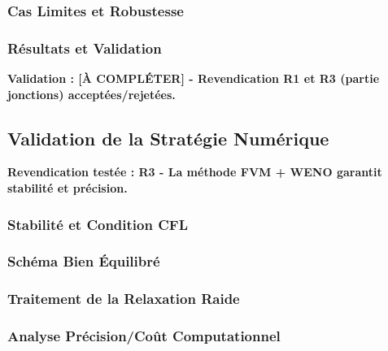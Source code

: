 \subsubsection{Cas Limites et Robustesse}
\label{subsec:cas_limites_jonctions}

\subsubsection{Résultats et Validation}
\label{subsec:resultats_jonctions}

\textbf{Validation : [À COMPLÉTER] - Revendication R1 et R3 (partie jonctions) acceptées/rejetées.}

\subsection{Validation de la Stratégie Numérique}
\label{sec:validation_numerique}

\textbf{Revendication testée : R3 - La méthode FVM + WENO garantit stabilité et précision.}

\subsubsection{Stabilité et Condition CFL}
\label{subsec:stabilite_cfl}

\subsubsection{Schéma Bien Équilibré}
\label{subsec:schema_equilibre}

\subsubsection{Traitement de la Relaxation Raide}
\label{subsec:relaxation_raide}

\subsubsection{Analyse Précision/Coût Computationnel}
\label{subsec:precision_cout}

